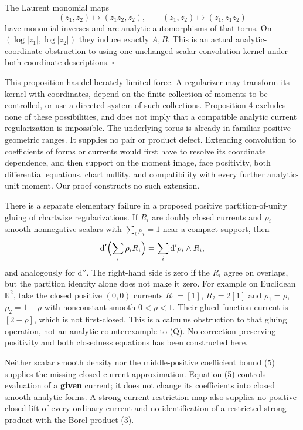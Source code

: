 \documentclass[
  11pt,
]{article}
\begin{document}
The Laurent monomial maps \[ (z_1,z_2)\longmapsto(z_1z_2,z_2),\qquad
   (z_1,z_2)\longmapsto(z_1,z_1z_2)\] have monomial inverses and are
analytic automorphisms of that torus. On \((\log|z_1|,\log|z_2|)\) they
induce exactly \(A,B\). This is an actual analytic-coordinate
obstruction to using one unchanged scalar convolution kernel under both
coordinate descriptions. \(\square\)

This proposition has deliberately limited force. A regularizer may
transform its kernel with coordinates, depend on the finite collection
of moments to be controlled, or use a directed system of such
collections. Proposition 4 excludes none of these possibilities, and
does not imply that a compatible analytic current regularization is
impossible. The underlying torus is already in familiar positive
geometric ranges. It supplies no pair or product defect. Extending
convolution to coefficients of forms or currents would first have to
resolve its coordinate dependence, and then support on the moment image,
face positivity, both differential equations, chart nullity, and
compatibility with every further analytic-unit moment. Our proof
constructs no such extension.

There is a separate elementary failure in a proposed positive
partition-of-unity gluing of chartwise regularizations. If \(R_i\) are
doubly closed currents and \(\rho_i\) smooth nonnegative scalars with
\(\sum_i\rho_i=1\) near a compact support, then
\[\mathrm d'\Bigl(\sum_i\rho_iR_i\Bigr)
    =\sum_i\mathrm d'\rho_i\wedge R_i,\] and analogously for
\(\mathrm d''\). The right-hand side is zero if the \(R_i\) agree on
overlaps, but the partition identity alone does not make it zero. For
example on Euclidean \(\mathbb R^2\), take the closed positive \((0,0)\)
currents \(R_1=[1]\), \(R_2=2[1]\) and \(\rho_1=\rho\),
\(\rho_2=1-\rho\) with nonconstant smooth \(0<\rho<1\). Their glued
function current is \([2-\rho]\), which is not first-closed. This is a
calculus obstruction to that gluing operation, not an analytic
counterexample to (Q). No correction preserving positivity and both
closedness equations has been constructed here.

Neither scalar smooth density nor the middle-positive coefficient bound
(5) supplies the missing closed-current approximation. Equation (5)
controls evaluation of a \textbf{given} current; it does not change its
coefficients into closed smooth analytic forms. A strong-current
restriction map also supplies no positive closed lift of every ordinary
current and no identification of a restricted strong product with the
Borel product (3).
\end{document}
